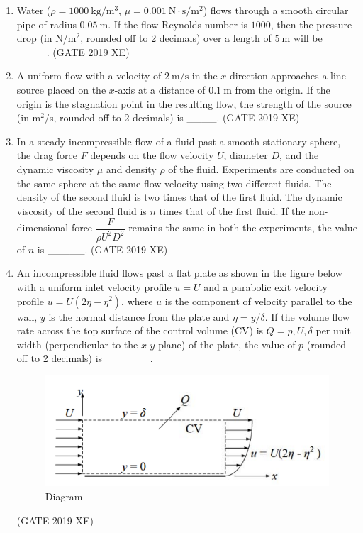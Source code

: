 \documentclass[journal,12pt,onecolumn]{IEEEtran}
\begin{document}
\begin{enumerate}
\item Water ($\rho=1000\ \mathrm{kg/m^3}$, $\mu=0.001\ \mathrm{N\cdot s/m^2}$) flows through a smooth circular pipe of radius $0.05\ \mathrm{m}$. If the flow Reynolds number is $1000$, then the pressure drop (in N/m$^2$, rounded off to 2 decimals) over a length of $5\ \mathrm{m}$ will be \_\_\_\_.
\hfill{(GATE 2019 XE)} \\


\item A uniform flow with a velocity of $2\ \mathrm{m/s}$ in the $x$-direction approaches a line source placed on the $x$-axis at a distance of $0.1\ \mathrm{m}$ from the origin. If the origin is the stagnation point in the resulting flow, the strength of the source (in m$^2$/s, rounded off to 2 decimals) is \_\_\_\_.
\hfill{(GATE 2019 XE)} \\


\item In a steady incompressible flow of a fluid past a smooth stationary sphere, the drag force $F$ depends on the flow velocity $U$, diameter $D$, and the dynamic viscosity $\mu$ and density $\rho$ of the fluid. Experiments are conducted on the same sphere at the same flow velocity using two different fluids. The density of the second fluid is two times that of the first fluid. The dynamic viscosity of the second fluid is $n$ times that of the first fluid. If the non-dimensional force $\dfrac{F}{\rho U^2 D^2}$ remains the same in both the experiments, the value of $n$ is \_\_\_\_\_.
\hfill{(GATE 2019 XE)} \\

\newpage

\item An incompressible fluid flows past a flat plate as shown in the figure below with a uniform inlet velocity profile $u=U$ and a parabolic exit velocity profile $u=U(2\eta - \eta^2)$, where $u$ is the component of velocity parallel to the wall, $y$ is the normal distance from the plate and $\eta=y/\delta$. If the volume flow rate across the top surface of the control volume (CV) is $Q=p,U,\delta$ per unit width (perpendicular to the $x$-$y$ plane) of the plate, the value of $p$ (rounded off to 2 decimals) is \_\_\_\_\_\_.

\begin{figure}[htbp]
  \centering
  \includegraphics[width=.7\columnwidth]{figs/B/fig4.png}
  \caption{Diagram}
  \label{fig:figs/B/fig4.png}
\end{figure}
\hfill{(GATE 2019 XE)} \\


\end{enumerate}
\end{document}
